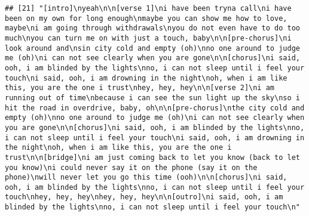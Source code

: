 \documentclass[]{article}
\begin{document}
\begin{verbatim}
## [21] "[intro]\nyeah\n\n[verse 1]\ni have been tryna call\ni have been on my own for long enough\nmaybe you can show me how to love, maybe\ni am going through withdrawals\nyou do not even have to do too much\nyou can turn me on with just a touch, baby\n\n[pre-chorus]\ni look around and\nsin city cold and empty (oh)\nno one around to judge me (oh)\ni can not see clearly when you are gone\n\n[chorus]\ni said, ooh, i am blinded by the lights\nno, i can not sleep until i feel your touch\ni said, ooh, i am drowning in the night\noh, when i am like this, you are the one i trust\nhey, hey, hey\n\n[verse 2]\ni am running out of time\nbecause i can see the sun light up the sky\nso i hit the road in overdrive, baby, oh\n\n[pre-chorus]\nthe city cold and empty (oh)\nno one around to judge me (oh)\ni can not see clearly when you are gone\n\n[chorus]\ni said, ooh, i am blinded by the lights\nno, i can not sleep until i feel your touch\ni said, ooh, i am drowning in the night\noh, when i am like this, you are the one i trust\n\n[bridge]\ni am just coming back to let you know (back to let you know)\ni could never say it on the phone (say it on the phone)\nwill never let you go this time (ooh)\n\n[chorus]\ni said, ooh, i am blinded by the lights\nno, i can not sleep until i feel your touch\nhey, hey, hey\nhey, hey, hey\n\n[outro]\ni said, ooh, i am blinded by the lights\nno, i can not sleep until i feel your touch\n"                                                                                                                                                                                                                                                                                                                                                                                                                                                                                                                                                                                                                                                                                                                                                                                                                                                                                                                                                                                                                                                                                                                                                                                                                                                                                                                                                                                                                                                                                                         

\end{verbatim}
\end{document}
